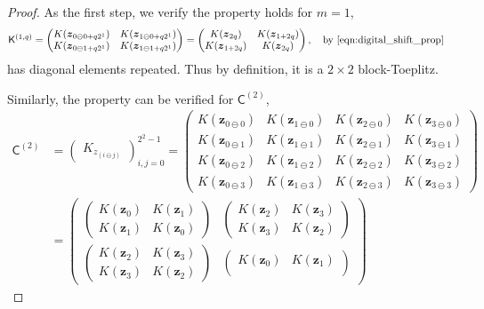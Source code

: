 \documentclass{iitthesis}          %
\newcommand{\bm}[1]{\boldsymbol{#1}}
\newcommand{\vz}{\bm{z}}
\newcommand{\mC}{\mathsf{C}}
\newcommand{\mK}{\mathsf{K}}
\begin{document}
\begin{proof}
\iftrue
As the first step, we verify the property holds for $m=1$,
\begin{align*}
\mK^{(1, q)} &= \begin{pmatrix}
K(\vz_{0 \ominus 0 + q 2^1}) & K(\vz_{1 \ominus 0 + q 2^1})  \\
K(\vz_{0 \ominus 1 + q 2^1}) & K(\vz_{1 \ominus 1 + q 2^1})  
\end{pmatrix} = 
\begin{pmatrix}
K(\vz_{2q}) & K(\vz_{1 + 2q}) \\ K(\vz_{1 + 2q}) & K(\vz_{2q})
\end{pmatrix}, \quad \text{by \eqref{eqn:digital_shift_prop}}
\end{align*} has diagonal elements repeated. Thus by definition, it is a $2\times 2$ block-Toeplitz.
\fi 

\iffalse
Similarly, the property can be verified for $\mC^{(2)}$, 
\begin{align*}
\mC^{(2)} &= 
\begin{pmatrix}
K_{z_{(i \ominus j )}}
\end{pmatrix}_{i,j=0}^{2^2-1}
=
\begin{pmatrix}
K(\vz_{0 \ominus 0}) & K(\vz_{1 \ominus 0}) & K(\vz_{2 \ominus 0}) & K(\vz_{3 \ominus 0}) \\
K(\vz_{0 \ominus 1}) & K(\vz_{1 \ominus 1}) & K(\vz_{2 \ominus 1}) & K(\vz_{3 \ominus 1}) \\
K(\vz_{0 \ominus 2}) & K(\vz_{1 \ominus 2}) & K(\vz_{2 \ominus 2}) & K(\vz_{3 \ominus 2}) \\
K(\vz_{0 \ominus 3}) & K(\vz_{1 \ominus 3}) & K(\vz_{2 \ominus 3}) & K(\vz_{3 \ominus 3}) 
\end{pmatrix} \\
& = 
\begin{pmatrix}
\begin{pmatrix}
K(\vz_{0}) & K(\vz_{1}) \\
K(\vz_{1}) & K(\vz_{0})
\end{pmatrix} &
\begin{pmatrix}
K(\vz_{2}) & K(\vz_{3}) \\
K(\vz_{3}) & K(\vz_{2}) 
\end{pmatrix} \\
\begin{pmatrix}
K(\vz_{2}) & K(\vz_{3}) \\
K(\vz_{3}) & K(\vz_{2}) 
\end{pmatrix} &
\begin{pmatrix}
K(\vz_{0}) & K(\vz_{1}) \\

\end{pmatrix}
\end{pmatrix}
\end{align*}
\end{proof}
\end{document}
